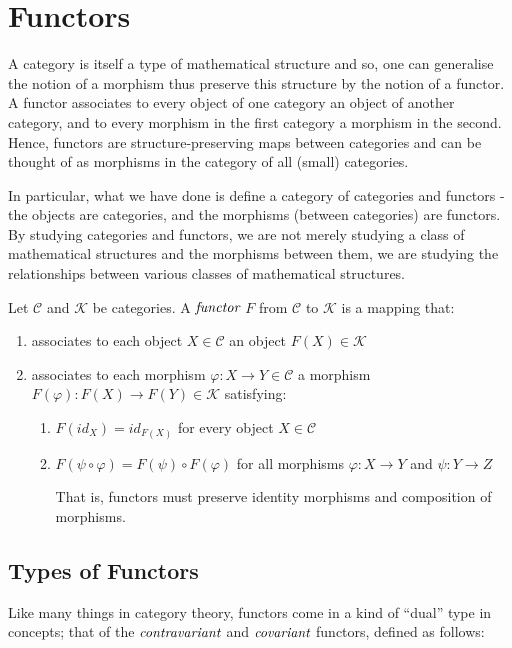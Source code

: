 \section{Functors} %
\label{sec:functors}
A category is itself a type of mathematical structure and so, one can generalise the notion of a morphism thus preserve this structure by the notion of a
functor.
A functor associates to every object of one category an object of another category, and to every morphism in the first category a morphism in the second.
Hence, functors are structure-preserving maps between categories and can be thought of as morphisms in the category of all (small) categories.

In particular, what we have done is define a category of categories and functors - the objects are categories, and the morphisms (between categories) 
are functors.
By studying categories and functors, we are not merely studying a class of mathematical structures and the morphisms between them,
we are studying the relationships between various classes of mathematical structures.

\begin{defn}[Functor]
	Let $\mathcal{C}$ and $\mathcal{K}$ be categories. A $\emph{functor}$ $F$ from $\mathcal{C}$ to $\mathcal{K}$ is a mapping that:
	\begin{enumerate}
		\item associates to each object $X \in \mathcal{C}$ an object $F(X) \in  \mathcal{K}$
		
		\item associates to each morphism $\varphi: X \to Y \in \mathcal{C}$ a morphism $F(\varphi) : F(X) \to F(Y) \in \mathcal{K}$
		satisfying:
		\begin{enumerate}
			\item $F(id_{X}) = id_{F(X)}$ for every object $X \in \mathcal{C}$
			
			\item $F(\psi \circ \varphi) = F(\psi) \circ F(\varphi)$ for all morphisms $\varphi: X \to Y$ and $\psi: Y \to Z$
			\begin{rem}
				That is, functors must preserve identity morphisms and composition of morphisms.
			\end{rem}
		\end{enumerate}
	\end{enumerate}
\end{defn}

\subsection{Types of Functors} %
\label{subsec:functorstypes}
Like many things in category theory, functors come in a kind of ``dual'' type in concepts;
that of the $\emph{contravariant}$ and $\emph{covariant}$ functors, defined as follows:

